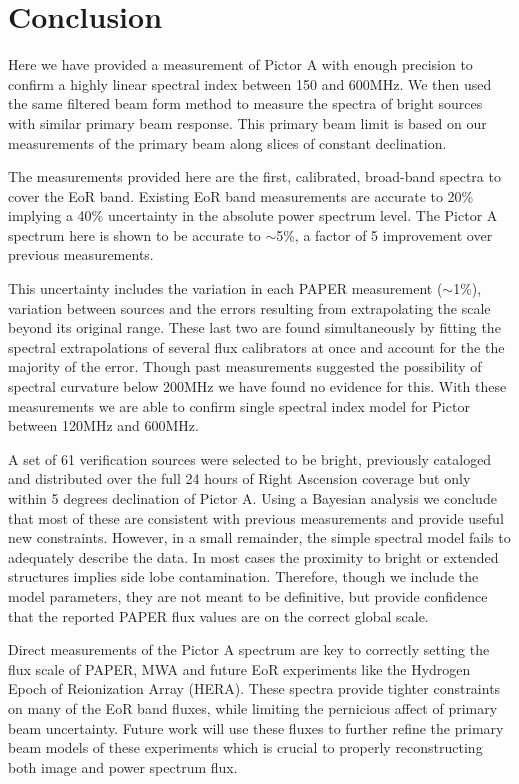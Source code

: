\documentclass[preprint]{aastex}
\begin{document}

 \section{Conclusion}
 \label{sec:Conclusion}

Here we have provided a measurement of Pictor A with enough precision to confirm
a highly linear spectral index between 150 and 600MHz. We then used the same
filtered beam form method to measure the spectra of bright sources with similar
primary beam response. This primary beam limit is based on our measurements 
of the primary beam along slices of constant declination.  


The measurements provided
here are the first, calibrated, broad-band spectra to cover the EoR band. Existing EoR band measurements
are accurate to 20\% implying a 40\% uncertainty in the absolute power spectrum
level.  The Pictor A spectrum here is shown to be accurate to 
$\sim$5\%, a factor of 5 improvement over previous measurements.

This uncertainty includes the 
variation in each PAPER measurement ($\sim$1\%), variation between sources and the errors resulting
from extrapolating the \citet{Baars:1977p9678} scale beyond its original range. These last
two are found simultaneously by fitting the spectral extrapolations of several flux calibrators
at once and account for the the majority of the error. Though past measurements suggested the possibility
of spectral curvature below 200MHz we have found no evidence for this.  With these measurements we are able 
to confirm single spectral index model for Pictor between 120MHz and 600MHz.

A set of  61 verification sources were selected to be bright, previously cataloged
and  distributed over
the full 24 hours of Right Ascension coverage but only within 5 degrees
declination of Pictor A.  Using a Bayesian analysis we conclude that most of
these are consistent with previous measurements and provide useful new
constraints. However, in a small remainder, the simple spectral model fails to
adequately describe the data. In most cases the proximity to bright or extended
structures implies side lobe contamination.  Therefore, though we include the
model parameters, they are not meant to be definitive, but provide confidence
that the reported PAPER flux values are on the correct global scale.


Direct measurements of the Pictor A spectrum are key to correctly setting the
flux scale of PAPER, MWA and future EoR experiments like the Hydrogen Epoch of Reionization Array (HERA).
These spectra provide tighter constraints on many of the EoR band fluxes, while
limiting the pernicious affect of primary beam uncertainty.  Future work will use these
fluxes to further  refine the primary beam models of these experiments which is crucial to properly reconstructing
both image and power spectrum flux.
\end{document}
